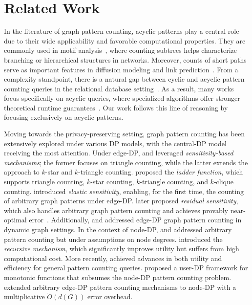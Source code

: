 \section{Related Work}


{
In the literature of graph pattern counting, acyclic patterns play a central role due to their wide applicability and favorable computational properties. 
They are commonly used in motif analysis~\cite{milo2002network, itzkovitz2005subgraphs}, where counting subtrees helps characterize branching or hierarchical structures in networks. 
Moreover, counts of short paths serve as important features in diffusion modeling and link prediction~\cite{katz1953new, liben2003link}. 
From a complexity standpoint, there is a natural gap between cyclic and acyclic pattern counting queries in the relational database setting~\cite{ngo2018worst,abo2016faq}. 
As a result, many works focus specifically on acyclic queries, where specialized algorithms offer stronger theoretical runtime guarantees~\cite{yannakakis1981algorithms, gottlob2001complexity}. 
Our work follows this line of reasoning by focusing exclusively on acyclic patterns.
}



Moving towards the privacy-preserving setting, graph pattern counting has been extensively explored under various DP models, with the central-DP model receiving the most attention. 
Under edge-DP, \citet{nissim2007smooth} and \citet{karwa2011private} leveraged \emph{sensitivity-based mechanisms}; the former focuses on triangle counting, while the latter extends the approach to $k$-star and $k$-triangle counting. \citet{zhang2015private} proposed the \emph{ladder function}, which supports triangle counting, $k$-star counting, $k$-triangle counting, and $k$-clique counting. 
\citet{johnson2018towards} introduced \emph{elastic sensitivity}, enabling, for the first time, the counting of arbitrary graph patterns under edge-DP. \citet{dong21:residual} later proposed \emph{residual sensitivity}, which also handles arbitrary graph pattern counting and achieves provably near-optimal error~\cite{dong2021nearly}.
Additionally, \citet{fichtenberger2021differentially} and \citet{dong2024continual} addressed edge-DP graph pattern counting in dynamic graph settings.
In the context of node-DP, \citet{kasiviswanathan2013analyzing} and \citet{blocki2013differentially} addressed arbitrary pattern counting but under assumptions on node degrees. 
\citet{chen2013recursive} introduced the \emph{recursive mechanism}, which significantly improves utility but suffers from high computational cost.
More recently, \citet{dong2022r2t,dong2024instance} achieved advances in both utility and efficiency for general pattern counting queries.
\citet{fang2022shifted} proposed a user-DP framework for monotonic functions that subsumes the node-DP pattern counting problem.
\citet{hu2025n2e} extended arbitrary edge-DP pattern counting mechanisms to node-DP with a multiplicative $\tilde{O}(d(G))$ error overhead.



